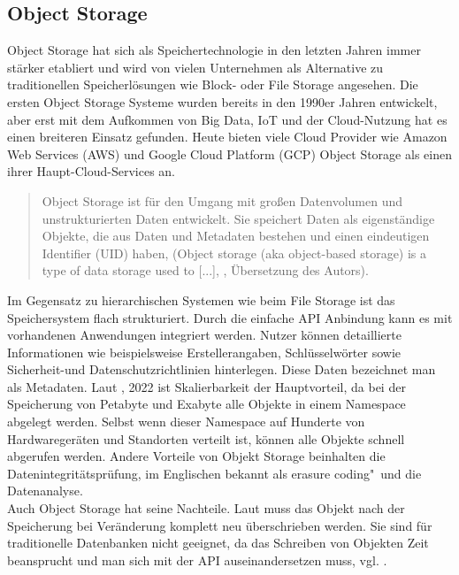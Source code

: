 \newpage

\subsection{Object Storage}

Object Storage hat sich als Speichertechnologie in den letzten Jahren immer stärker etabliert und wird von vielen Unternehmen als Alternative zu traditionellen Speicherlösungen wie Block- oder File Storage angesehen. Die ersten Object Storage Systeme wurden bereits in den 1990er Jahren entwickelt, aber erst mit dem Aufkommen von Big Data, IoT und der Cloud-Nutzung 
 hat es einen breiteren Einsatz gefunden. Heute bieten viele Cloud Provider wie Amazon Web Services (AWS) und Google Cloud Platform (GCP) Object Storage als einen ihrer Haupt-Cloud-Services an.
 
\begin{quote}
	Object Storage ist für den Umgang mit großen Datenvolumen und unstrukturierten Daten entwickelt. Sie speichert Daten als eigenständige Objekte, die aus Daten und Metadaten bestehen und einen eindeutigen Identifier (UID) haben, (\glqq Object storage (aka object-based storage) is a type of data storage used to [...]\grqq, \cite{dataCore-OS}, Übersetzung des Autors).
\end{quote}

Im Gegensatz zu hierarchischen Systemen wie beim File Storage ist das Speichersystem flach strukturiert. Durch die einfache API Anbindung kann es mit vorhandenen Anwendungen integriert werden. Nutzer können detaillierte Informationen wie beispielsweise Erstellerangaben, Schlüsselwörter sowie Sicherheit-und Datenschutzrichtlinien hinterlegen. Diese Daten bezeichnet man als Metadaten. Laut \citeauthor{nx-fileScala}, 2022 ist Skalierbarkeit der Hauptvorteil, da bei der Speicherung von Petabyte und Exabyte alle Objekte in einem Namespace abgelegt werden. Selbst wenn dieser Namespace auf Hunderte von Hardwaregeräten und Standorten verteilt ist, können alle Objekte schnell abgerufen werden. Andere Vorteile von Objekt Storage beinhalten die Datenintegritätsprüfung, im Englischen bekannt als \glqq erasure coding"\ und die Datenanalyse.\\

Auch Object Storage hat seine Nachteile. Laut \citeauthor{redHat-storage} muss das Objekt nach der Speicherung bei Veränderung komplett neu überschrieben werden. Sie sind für traditionelle Datenbanken nicht geeignet, da das Schreiben von Objekten Zeit beansprucht und man sich mit der API auseinandersetzen muss, vgl. \citeauthor{redHat-storage}.\\

